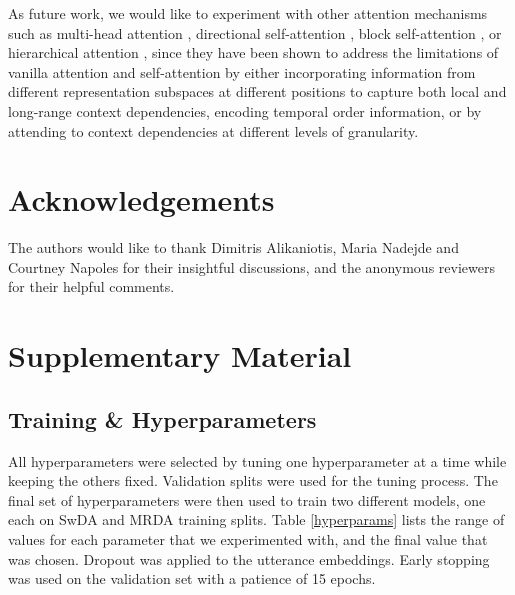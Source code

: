 \documentclass[11pt,a4paper]{article}
\begin{document}
As future work, we would like to experiment with other attention mechanisms such as multi-head attention \cite{vaswani2017attention}, directional self-attention \cite{shen2018disan}, block self-attention \cite{shen2018bidirectional}, or hierarchical attention \cite{yang2016hierarchical}, since they have been shown to address the limitations of vanilla attention and self-attention by either incorporating information from different representation subspaces at different positions to capture both local and long-range context dependencies, encoding temporal order information, or by attending to context dependencies at different levels of granularity. 



















\section*{Acknowledgements}
The authors would like to thank Dimitris Alikaniotis, Maria Nadejde and Courtney Napoles for their insightful discussions, and the anonymous reviewers for their helpful comments.




\appendix


















\section{Supplementary Material}
\label{sec:supplemental}

\subsection{Training \& Hyperparameters}
All hyperparameters were selected by tuning one hyperparameter at a time while keeping the others fixed. Validation splits were used for the tuning process. The final set of hyperparameters were then used to train two different models, one each on SwDA and MRDA training splits. Table \ref{hyperparams} lists the range of values for each parameter that we experimented with, and the final value that was chosen. Dropout was applied to the utterance embeddings. Early stopping was used on the validation set with a patience of 15 epochs. 
\end{document}
